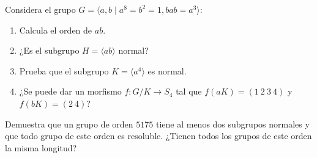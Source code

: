 \documentclass[12pt]{article}
\begin{document}
    \begin{ejercicio}[2.5 puntos]
        Considera el grupo $G=\langle a,b\mid a^8 = b^2 = 1, bab = a^3 \rangle $:
        \begin{enumerate}[label=(\alph*)]
            \item Calcula el orden de $ab$.
            \item ¿Es el subgrupo $H = \langle ab \rangle $ normal?
            \item Prueba que el subgrupo $K = \langle a^4 \rangle $ es normal.
            \item ¿Se puede dar un morfismo $f:G/K\to S_4$ tal que $f(aK)=(1\ 2\ 3\ 4)$ y $f(bK) = (2\ 4)$?
        \end{enumerate}
    \end{ejercicio}

    \begin{ejercicio}[2.5 puntos]
        Demuestra que un grupo de orden $5175$ tiene al menos dos subgrupos normales y que todo grupo de este orden es resoluble. ¿Tienen todos los grupos de este orden la misma longitud?
    \end{ejercicio}
\end{document}
